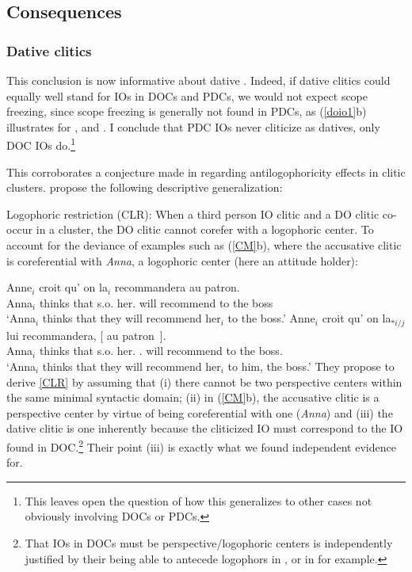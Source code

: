 \documentclass[output=paper]{langsci/langscibook}
\begin{document}
\subsection{Consequences}

\subsubsection{Dative clitics}

This conclusion is now informative about dative .
Indeed, if dative clitics could equally well stand for
\glspl{IO} in \glspl{DOC} and \glspl{PDC}, we
would not expect scope freezing, since scope freezing is generally not found in
\glspl{PDC}, as (\ref{doio1}b) illustrates for , and .
I conclude that \gls{PDC} \glspl{IO}
never cliticize as datives, only \gls{DOC} \glspl{IO} do.\footnote{This leaves
open the question of how this generalizes to other cases not obviously
involving \glspl{DOC} or \glspl{PDC}.}

This corroborates a conjecture made in \citet{Charnavel2015} regarding
antilogophoricity effects in clitic clusters. \citet{Charnavel2015} propose the
following descriptive generalization:

\ea \label{CLR} Logophoric restriction (CLR): When a third person IO clitic and a DO clitic co-occur in a cluster, the DO clitic cannot corefer
with a logophoric center.
\z
%
To account for the deviance of examples such as (\ref{CM}b), where the
accusative clitic is coreferential with {\it Anna}, a logophoric center (here
an attitude holder):

\ea \label{CM} \ea
	\gll Anne$_i$ croit qu' on  la$_i$ recommandera au patron.\\
        Anna$_i$ thinks that s.o. her.\Acc{} {will recommend} {to the} boss \\
    \trans `Anna$_i$ thinks that they will recommend her$_i$ to the boss.'
    \ex
	\gll  Anne$_i$ croit qu' on la$_{*i/j}$ lui recommandera, [ au patron~].\\
    Anna$_i$ thinks that s.o. her.\Acc{} \Third.\Dat{} {will recommend} {} {to the} boss.\\
    \trans `Anna$_i$ thinks that they will recommend her$_i$ to him, the boss.'
\z
\z
%
They propose to derive \eqref{CLR} by assuming that (i) there cannot be two
perspective centers within the same minimal syntactic domain; (ii) in
(\ref{CM}b), the accusative clitic is a perspective center by virtue of being
coreferential with one ({\it Anna}) and (iii) the dative clitic is one
inherently because the cliticized IO must correspond to the IO found in
DOC.\footnote{That \glspl{IO} in \glspl{DOC} must be perspective/logophoric
    centers is independently justified by their being able to antecede
    logophors in , or in  for example.} Their point (iii) is
    exactly what we found independent evidence for.
\end{document}
